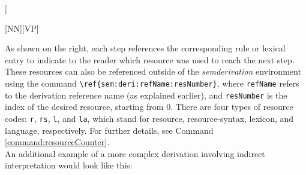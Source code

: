 \documentclass[10pt, a4paper]{article}
\begin{document}
	\begin{semcalc}[\stwo]
		\begin{semtreesem}
			\begin{forest}
				[{\e{Peter sleeps}\\S:\typet},name=0
				[{\e{Peter}\\NN:\typee},name=00]
				[{\e{sleeps}\\V:\typeet},name=01]
				]
			\end{forest}
		\end{semtreesem}
		\begin{semlang}
		\end{semlang}
		\begin{semrule}
			\rsrdesbjpred
		\end{semrule}
		\begin{semlex}
		\end{semlex}
		\begin{semderi}
		\end{semderi}
	\end{semcalc}
	As shown on the right, each step references the corresponding rule or lexical entry to indicate to the reader which resource was used to reach the next step. These resources can also be referenced outside of the \textit{semderivation} environment using the command \verb=\ref{sem:deri:refName:resNumber}=, where \texttt{refName} refers to the derivation reference name (as explained earlier), and \texttt{resNumber} is the index of the desired resource, starting from 0. There are four types of resource codes: \texttt{r}, \texttt{rs}, \texttt{l}, and \texttt{la}, which stand for resource, resource-syntax, lexicon, and language, respectively. For further details, see Command \ref{command:resourceCounter}.
	\\
	An additional example of a more complex derivation involving indirect interpretation would look like this:
\end{document}
